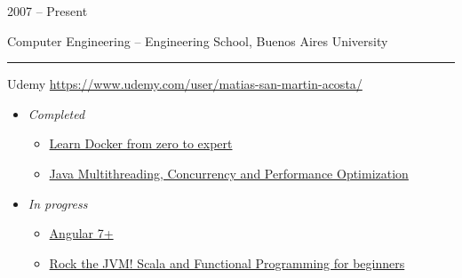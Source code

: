 \documentclass[a4paper,10pt]{article}
\newlength{\cvcolumngapwidth}
\newlength{\cvleftcolumnwidth}
\newlength{\cvrightcolumnwidth}
\newcommand{\cvsectionstyle}[1]{{\normalsize\cvsectionfont\textcolor{cvsectioncolor}{#1}}}
\newcommand{\cvtitlestyle}[1]{{\large\cvtitlefont\textcolor{cvtitlecolor}{#1}}}
\newcommand{\cvdurationstyle}[1]{{\small\cvdurationfont\textcolor{cvdurationcolor}{#1}}}
\newlength{\cvafteritemskipamount}
\newlength{\cvaftersectionskipamount}
\newlength{\cvaftertitleskipamount}
\newlength{\cvparskip}
\newcommand{\cvsection}[1]{
    \begin{minipage}[t]{\cvleftcolumnwidth}
        \raggedleft\cvsectionstyle{#1}
    \end{minipage}%
    \hspace{\cvcolumngapwidth}%
    \begin{minipage}[t]{\cvrightcolumnwidth}
        \textcolor{cvrulecolor}{\rule{\cvrightcolumnwidth}{0.6mm}}
    \end{minipage}

    \vspace{\cvaftersectionskipamount}
}
\newcommand{\cvitem}[2]{
    \begin{minipage}[t]{\cvleftcolumnwidth}
        \raggedleft #1
    \end{minipage}%
    \hspace{\cvcolumngapwidth}%
    \begin{minipage}[t]{\cvrightcolumnwidth}
        \setlength{\parskip}{\cvparskip} #2
    \end{minipage}

    \vspace{\cvafteritemskipamount}
}
\newcommand{\cvtitle}[1]{
    \cvtitlestyle{#1}

    \vspace{\cvaftertitleskipamount}
    \vspace{-\cvparskip}
}
\begin{document}
\cvitem{
    \cvdurationstyle{2007 -- Present}
}{
    \cvtitle{Computer Engineering -- \normalsize Engineering School, Buenos Aires University}
     
}


\cvsection{COURSES}

\cvitem{
    \cvdurationstyle{}
}{
    \cvtitle{Udemy \normalsize \href{https://www.udemy.com/user/matias-san-martin-acosta/}{https://www.udemy.com/user/matias-san-martin-acosta/}}
    
    \begin{itemize}[leftmargin=*]
    
        \item \emph{Completed}
            \begin{itemize}[leftmargin=*]
                \item \href{https://www.udemy.com/certificate/UC-VANR3KSW/}{Learn Docker from zero to expert}
                \item \href{https://www.udemy.com/certificate/UC-Y0TQHFO5/}{Java Multithreading, Concurrency and Performance Optimization}
            \end{itemize}
        \item \emph{In progress}
            \begin{itemize}[leftmargin=*]
            \item \href{https://www.udemy.com/angular-2-fernando-herrera/}{Angular 7+}
            \item \href{https://www.udemy.com/course/rock-the-jvm-scala-for-beginners/}{Rock the JVM! Scala and Functional Programming for beginners}
            \end{itemize}
    

\end{itemize}}
\end{document}
